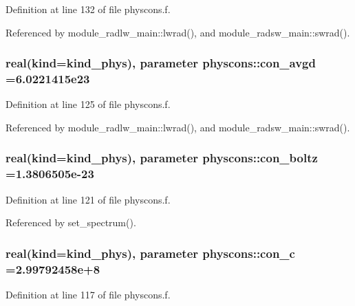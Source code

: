 Definition at line 132 of file physcons.\+f.



Referenced by module\+\_\+radlw\+\_\+main\+::lwrad(), and module\+\_\+radsw\+\_\+main\+::swrad().

\subsubsection[{\texorpdfstring{con\+\_\+avgd}{con_avgd}}]{\setlength{\rightskip}{0pt plus 5cm}real(kind=kind\+\_\+phys), parameter physcons\+::con\+\_\+avgd =6.\+0221415e23}\hypertarget{namespacephyscons_ab54a93783404e24a0392dac0e0efa6b5}{}\label{namespacephyscons_ab54a93783404e24a0392dac0e0efa6b5}


Definition at line 125 of file physcons.\+f.



Referenced by module\+\_\+radlw\+\_\+main\+::lwrad(), and module\+\_\+radsw\+\_\+main\+::swrad().

\subsubsection[{\texorpdfstring{con\+\_\+boltz}{con_boltz}}]{\setlength{\rightskip}{0pt plus 5cm}real(kind=kind\+\_\+phys), parameter physcons\+::con\+\_\+boltz =1.\+3806505e-\/23}\hypertarget{namespacephyscons_a9c7c365685bc2319763e5bbe1300b852}{}\label{namespacephyscons_a9c7c365685bc2319763e5bbe1300b852}


Definition at line 121 of file physcons.\+f.



Referenced by set\+\_\+spectrum().

\subsubsection[{\texorpdfstring{con\+\_\+c}{con_c}}]{\setlength{\rightskip}{0pt plus 5cm}real(kind=kind\+\_\+phys), parameter physcons\+::con\+\_\+c =2.\+99792458e+8}\hypertarget{namespacephyscons_a5ea39e1c39e8ae07b8e76586452a9279}{}\label{namespacephyscons_a5ea39e1c39e8ae07b8e76586452a9279}


Definition at line 117 of file physcons.\+f.



